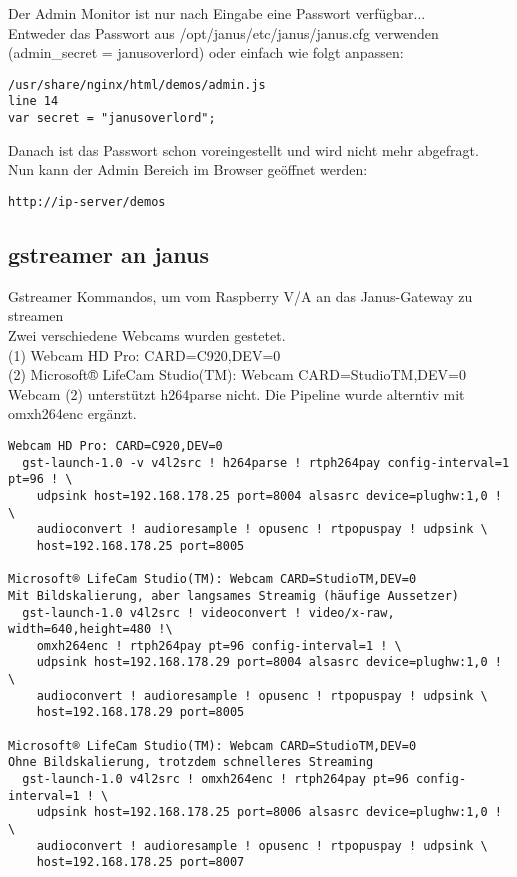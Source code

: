 Der Admin Monitor ist nur nach Eingabe eine Passwort verfügbar...\\
Entweder das Passwort aus /opt/janus/etc/janus/janus.cfg verwenden (admin\_secret = janusoverlord) oder einfach wie folgt anpassen:
\begin{verbatim}
/usr/share/nginx/html/demos/admin.js
line 14
var secret = "janusoverlord";
\end{verbatim}
Danach ist das Passwort schon voreingestellt und wird nicht mehr abgefragt.\\
Nun kann der Admin Bereich im Browser geöffnet werden:
\begin{verbatim}
http://ip-server/demos
\end{verbatim}

\subsection{gstreamer an janus} \label{RefGstrToJanus}
Gstreamer Kommandos, um vom Raspberry V/A an das Janus-Gateway zu streamen\\
Zwei verschiedene Webcams wurden gestetet. \\
(1) Webcam HD Pro: CARD=C920,DEV=0 \\
(2) Microsoft® LifeCam Studio(TM): Webcam CARD=StudioTM,DEV=0 \\
Webcam (2) unterstützt h264parse nicht. Die Pipeline wurde alterntiv mit 
omxh264enc ergänzt. 
\begin{verbatim}
Webcam HD Pro: CARD=C920,DEV=0
  gst-launch-1.0 -v v4l2src ! h264parse ! rtph264pay config-interval=1 pt=96 ! \
    udpsink host=192.168.178.25 port=8004 alsasrc device=plughw:1,0 ! \ 
    audioconvert ! audioresample ! opusenc ! rtpopuspay ! udpsink \ 
    host=192.168.178.25 port=8005
 
Microsoft® LifeCam Studio(TM): Webcam CARD=StudioTM,DEV=0
Mit Bildskalierung, aber langsames Streamig (häufige Aussetzer)
  gst-launch-1.0 v4l2src ! videoconvert ! video/x-raw, width=640,height=480 !\
    omxh264enc ! rtph264pay pt=96 config-interval=1 ! \ 
    udpsink host=192.168.178.29 port=8004 alsasrc device=plughw:1,0 ! \
    audioconvert ! audioresample ! opusenc ! rtpopuspay ! udpsink \
    host=192.168.178.29 port=8005 
   
Microsoft® LifeCam Studio(TM): Webcam CARD=StudioTM,DEV=0
Ohne Bildskalierung, trotzdem schnelleres Streaming
  gst-launch-1.0 v4l2src ! omxh264enc ! rtph264pay pt=96 config-interval=1 ! \ 
    udpsink host=192.168.178.25 port=8006 alsasrc device=plughw:1,0 ! \
    audioconvert ! audioresample ! opusenc ! rtpopuspay ! udpsink \
    host=192.168.178.25 port=8007 
\end{verbatim}

